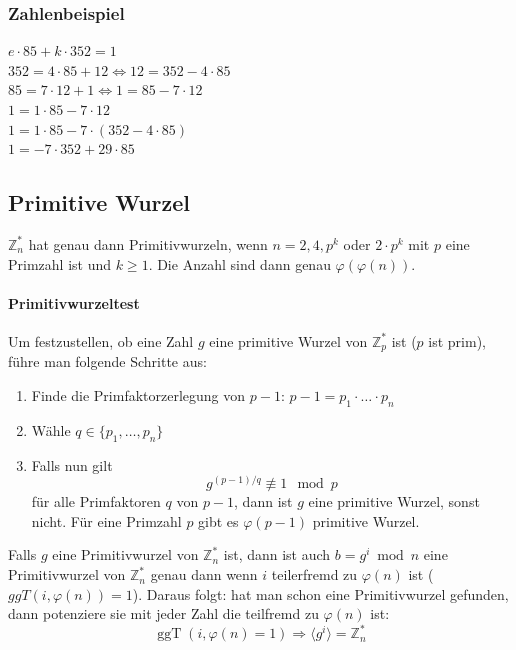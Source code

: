 \documentclass[8pt,a4paper,landscape]{article}
\begin{document}
\begin{multicols}{4}
\subsubsection{Zahlenbeispiel}
$e\cdot85+k\cdot352 = 1$\\
$352 = 4\cdot85+12		\Leftrightarrow		12 = 352-4\cdot85$\\
$85 = 7\cdot12+1		\Leftrightarrow 	1 = 85-7\cdot12$\\
$1 = 1\cdot85-7\cdot12$\\
$1 = 1\cdot85-7\cdot(352-4\cdot85)$\\
$1 = -7\cdot352+29\cdot85$
\subsection{Primitive Wurzel}
\(\mathbb{Z}_{n}^{*}\) hat genau dann Primitivwurzeln,  wenn 
\(n = 2,4, p^{k}\) oder \(2 \cdot p^{k}\) mit \(p\) eine Primzahl ist und \(k \geq 1\). Die Anzahl sind dann genau \(\varphi(\varphi(n))\).

\paragraph{Primitivwurzeltest} Um festzustellen, ob eine Zahl $g$ eine primitive Wurzel von 
$\mathbb{Z}_{p}^{*}$ ist ($p$ ist prim), führe man folgende Schritte aus:
\begin{enumerate}
\item Finde die Primfaktorzerlegung von $p-1$: \( p-1=p_{1} \cdot \ldots \cdot  p_{n}\)
\item Wähle \(q \in \{p_{1}, \ldots,p_{n}\}\)
\item Falls nun gilt
\[
    \boxed{ g^{(p-1)/q} \not\equiv 1 \mod p }
\]
für alle Primfaktoren $q$ von $p-1$, dann ist $g$ eine primitive Wurzel,
sonst nicht. Für eine Primzahl $p$ gibt es $\varphi(p-1)$ primitive Wurzel.
\end{enumerate}
Falls $g$ eine Primitivwurzel von $\mathbb{Z}_{n}^{*}$ ist, dann ist auch 
$b = g^{i} \bmod n$ eine Primitivwurzel von $\mathbb{Z}_{n}^{*}$ genau dann 
wenn $i$ teilerfremd zu $\varphi(n)$ ist ($ggT(i, \varphi(n)) = 1$). Daraus folgt:
hat man schon eine Primitivwurzel gefunden, dann potenziere sie mit jeder Zahl die teilfremd zu $\varphi(n)$ ist:
\[
    \operatorname{ggT}(i, \varphi(n) = 1) \Rightarrow
    \langle g^{i} \rangle = \mathbb{Z}_{n}^{*}
\]


\end{multicols}
\end{document}
